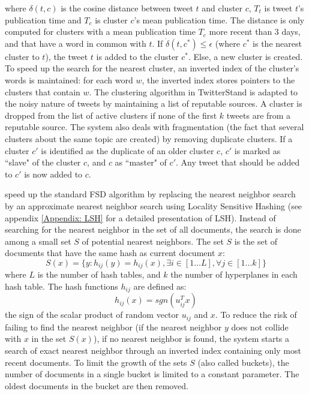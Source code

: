 where $\delta(t,c)$ is the cosine distance between tweet $t$ and cluster $c$, $T_t$ is tweet $t$'s publication time and $T_c$ is cluster $c$'s mean publication time. The distance is only computed for clusters with a mean publication time $T_c$ more recent than 3 days, and that have a word in common with $t$. If $\dot{\delta}(t,c^*) \leqslant \epsilon$ (where $c^*$ is the nearest cluster to $t$), the tweet $t$ is added to the cluster $c^*$. Else, a new cluster is created. To speed up the search for the nearest cluster, an inverted index of the cluster's words is maintained: for each word $w$, the inverted index stores pointers to the clusters that contain $w$. The clustering algorithm in TwitterStand is adapted to the noisy nature of tweets by maintaining a list of reputable sources. A cluster is dropped from the list of active clusters if none of the first $k$ tweets are from a reputable source. The system also deals with fragmentation (the fact that several clusters about the same topic are created) by removing duplicate clusters. If a cluster $c'$  is identified as the duplicate of an older cluster $c$, $c'$ is marked as ``slave" of the cluster $c$, and $c$ as ``master" of $c'$. Any tweet that should be added to $c'$ is now added to $c$.

\citet{petrovic_streaming_2010} speed up the standard FSD algorithm by replacing the nearest neighbor search by an approximate nearest neighbor search using Locality Sensitive Hashing (see appendix \ref{Appendix: LSH} for a detailed presentation of LSH). Instead of searching for the nearest neighbor in the set of all documents, the search is done among a small set $S$ of potential nearest neighbors. The set $S$ is the set of documents that have the same hash as current document $x$:
$$
S(x) = \{y: h_{ij}(y) = h_{ij}(x), \exists i \in [1 \ldots L], \forall j \in [1 \ldots k]\}
$$
where $L$ is the number of hash tables, and $k$ the number of hyperplanes in each hash table. The hash functions $h_{ij}$ are defined as:
$$
h_{ij}(x) = sgn(u_{ij}^Tx)
$$
the sign of the scalar product of random vector $u_{ij}$ and $x$. To reduce the risk of failing to find the nearest neighbor (if the nearest neighbor $y$ does not collide with $x$ in the set $S(x)$), if no nearest neighbor is found, the system starts a search of exact nearest neighbor through an inverted index containing only most recent documents. To limit the growth of the sets $S$ (also called buckets), the number of documents in a single bucket is limited to a constant parameter. The oldest documents in the bucket are then removed. 

